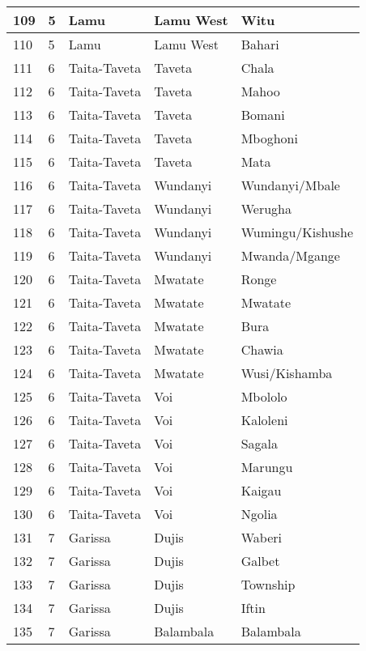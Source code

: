 \begin{table}[!ht]
\begin{tabular}{|l|l|l|l|l|}
        109 & 5 & Lamu & Lamu West & Witu \\ \hline
        110 & 5 & Lamu & Lamu West & Bahari \\ \hline
        111 & 6 & Taita-Taveta & Taveta & Chala \\ \hline
        112 & 6 & Taita-Taveta & Taveta & Mahoo \\ \hline
        113 & 6 & Taita-Taveta & Taveta & Bomani \\ \hline
        114 & 6 & Taita-Taveta & Taveta & Mboghoni \\ \hline
        115 & 6 & Taita-Taveta & Taveta & Mata \\ \hline
        116 & 6 & Taita-Taveta & Wundanyi & Wundanyi/Mbale \\ \hline
        117 & 6 & Taita-Taveta & Wundanyi & Werugha \\ \hline
        118 & 6 & Taita-Taveta & Wundanyi & Wumingu/Kishushe \\ \hline
        119 & 6 & Taita-Taveta & Wundanyi & Mwanda/Mgange \\ \hline
        120 & 6 & Taita-Taveta & Mwatate & Ronge \\ \hline
        121 & 6 & Taita-Taveta & Mwatate & Mwatate \\ \hline
        122 & 6 & Taita-Taveta & Mwatate & Bura \\ \hline
        123 & 6 & Taita-Taveta & Mwatate & Chawia \\ \hline
        124 & 6 & Taita-Taveta & Mwatate & Wusi/Kishamba \\ \hline
        125 & 6 & Taita-Taveta & Voi & Mbololo \\ \hline
        126 & 6 & Taita-Taveta & Voi & Kaloleni \\ \hline
        127 & 6 & Taita-Taveta & Voi & Sagala \\ \hline
        128 & 6 & Taita-Taveta & Voi & Marungu \\ \hline
        129 & 6 & Taita-Taveta & Voi & Kaigau \\ \hline
        130 & 6 & Taita-Taveta & Voi & Ngolia \\ \hline
        131 & 7 & Garissa & Dujis & Waberi \\ \hline
        132 & 7 & Garissa & Dujis & Galbet \\ \hline
        133 & 7 & Garissa & Dujis & Township \\ \hline
        134 & 7 & Garissa & Dujis & Iftin \\ \hline
        135 & 7 & Garissa & Balambala & Balambala \\ \hline

\end{tabular}
\end{table}
